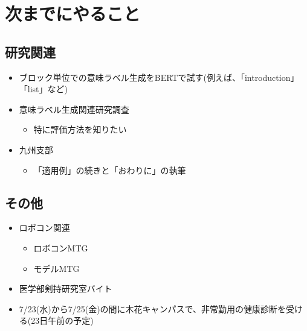 \documentclass[uplatex, onecolumn, 10pt]{jsarticle}
\begin{document}
\section{次までにやること}

\subsection*{研究関連}
\begin{itemize}
	\item ブロック単位での意味ラベル生成をBERTで試す(例えば、「introduction」「list」など)
	\item 意味ラベル生成関連研究調査
	\begin{itemize}
		\item 特に評価方法を知りたい
	\end{itemize}
	\item 九州支部
	\begin{itemize}
	\item 「適用例」の続きと「おわりに」の執筆
	\end{itemize}
\end{itemize}

\subsection*{その他}
\begin{itemize}
    \item ロボコン関連
		\begin{itemize}
			\item ロボコンMTG
			\item モデルMTG
		\end{itemize}
	\item 医学部剣持研究室バイト
	\item 7/23(水)から7/25(金)の間に木花キャンパスで、非常勤用の健康診断を受ける(23日午前の予定)
\end{itemize}
\end{document}
